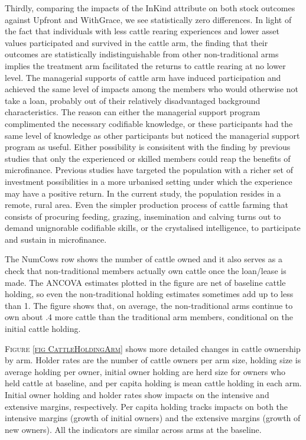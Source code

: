 	Thirdly, comparing the impacts of the \textsf{InKind} attribute on both stock outcomes against \textsf{Upfront} and \textsf{WithGrace}, we see statistically zero differences. In light of the fact that individuals with less cattle rearing experiences and lower asset values participated and survived in the \textsf{cattle} arm, the finding that their outcomes are statistically indistinguishable from other non-\textsf{traditional} arms implies the treatment arm facilitated the returns to cattle rearing at no lower level. The managerial supports of \textsf{cattle} arm have induced participation and achieved the same level of impacts among the members who would otherwise not take a loan, probably out of their relatively disadvantaged background characteristics. The reason can either the managerial support program complimented the necessary codifiable knowledge, or these participants had the same level of knowledge as other participants but noticed the managerial support program as useful. Either possibility is consisitent with the finding by previous studies that only the experienced or skilled members could reap the benefits of microfinance. Previous studies have targeted the population with a richer set of investment possibilities in a more urbanised setting under which the experience may have a positive return. In the current study, the population resides in a remote, rural area. Even the simpler production process of cattle farming that consists of procuring feeding, grazing, insemination and calving turns out to demand unignorable codifiable skills, or the crystalised intelligence, to participate and sustain in microfinance.
	
	The \textsf{NumCows} row shows the number of cattle owned and it also serves as a check that non-\textsf{traditional} members actually own cattle once the loan/lease is made. The ANCOVA estimates plotted in the figure are net of baseline cattle holding, so even the non-traditional holding estimates sometimes add up to less than 1. %
	The figure shows that, on average, the non-\textsf{traditional} arms continue to own about .4 more cattle than the \textsf{traditional} arm members, conditional on the initial cattle holding. 
	
	\textsc{\footnotesize Figure \ref{fig CattleHoldingArm}} shows more detailed changes in cattle ownership by arm. Holder rates are the number of cattle owners per arm size, holding size is average holding per owner, initial owner holding are herd size for owners who held cattle at baseline, and per capita holding is mean cattle holding in each arm. Initial owner holding and holder rates show impacts on the intensive and extensive margins, respectively. Per capita holding tracks impacts on both the intensive margins (growth of initial owners) and the extensive margins (growth of new owners). All the indicators are similar across arms at the baseline. 
	
